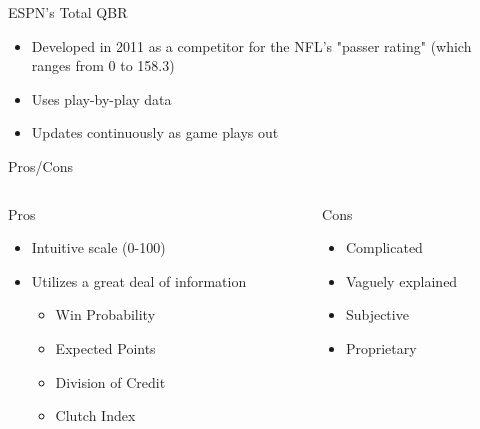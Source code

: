 \documentclass{beamer}
\begin{document}
	\begin{frame}{ESPN's Total QBR}
		\begin{itemize}
			\item Developed in 2011 as a competitor for the NFL's "passer rating" (which ranges from 0 to 158.3)
			\item Uses play-by-play data
			\item Updates continuously as game plays out
		\end{itemize}
		\begin{block}{Pros/Cons}
		\begin{columns}
			\begin{column}[t]{0.4\textwidth}
				Pros
				\begin{itemize}
					\item Intuitive scale (0-100)
					\item Utilizes a great deal of information
					\begin{itemize}
						\item Win Probability
						\item Expected Points
						\item Division of Credit
						\item Clutch Index
					\end{itemize}
				\end{itemize}
			\end{column}
			
			\begin{column}[t]{0.5\textwidth}
				Cons
				\begin{itemize}
					\item Complicated
					\item Vaguely explained
					\item Subjective
					\item Proprietary
				\end{itemize}
			\end{column}
		\end{columns}
		\end{block}
	\end{frame}
\end{document}
